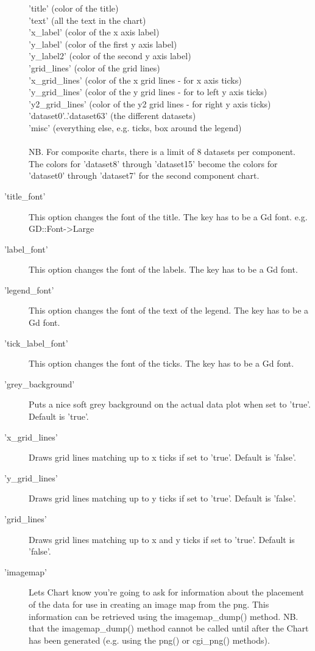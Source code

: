 \begin{description}
'title' (color of the title)\\
'text' (all the text in the chart)\\
'x\_label' (color of the x axis label)\\ 
'y\_label' (color of the first y axis label)\\
'y\_label2' (color of the second y axis label)\\
'grid\_lines' (color of the grid lines)\\
'x\_grid\_lines' (color of the x grid lines - for x axis ticks)\\
'y\_grid\_lines' (color of the y grid lines - for to left y axis ticks)\\
'y2\_grid\_lines' (color of the y2 grid lines - for right y axis ticks)\\
'dataset0'..'dataset63' (the different datasets)\\
'misc' (everything else, e.g. ticks, box around the legend)\\
\\
NB. For composite charts, there is a limit of 8 datasets per component. The colors for 'dataset8' through 'dataset15' become the colors for 'dataset0' through 'dataset7' for the second component chart.
\item['title\_font'] This option changes the font of the title. The key has to be a Gd font. e.g. GD::Font->Large 
\item['label\_font'] This option changes the font of the labels. The key has to be a Gd font. 
\item['legend\_font'] This option changes the font of the text of the legend. The key has to be a Gd font. 
\item['tick\_label\_font'] This option changes the font of the ticks. The key has to be a Gd font. 
\item['grey\_background']Puts a nice soft grey background on the actual data plot when set to 'true'.  Default is 'true'.
\item['x\_grid\_lines']Draws grid lines matching up to x ticks if set to 'true'. Default is 'false'.
\item['y\_grid\_lines']Draws grid lines matching up to y ticks if set to 'true'. Default is 'false'.
\item['grid\_lines']Draws grid lines matching up to x and y ticks if set to 'true'. Default is 'false'. 
\item['imagemap']Lets Chart know you're going to ask for information about the placement of the data for use in creating an image map from the png. This information can be retrieved using the imagemap\_dump() method.  NB. that the imagemap\_dump() method cannot be called until after the Chart has been generated (e.g. using the png() or cgi\_png() methods).

\end{description}
